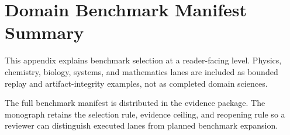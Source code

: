 \section{Domain Benchmark Manifest Summary}

\label{sec:oc-core-1-3-domain-benchmark-manifest-summary}

This appendix explains benchmark selection at a reader-facing level. Physics, chemistry, biology, systems, and mathematics lanes are included as bounded replay and artifact-integrity examples, not as completed domain sciences.


The full benchmark manifest is distributed in the evidence package. The monograph retains the selection rule, evidence ceiling, and reopening rule so a reviewer can distinguish executed lanes from planned benchmark expansion.

